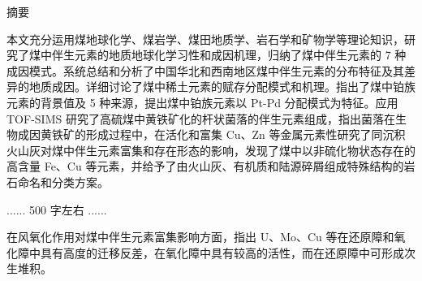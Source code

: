 \clearpage
\pagestyle{fancy}
{}
\setcounter{page}{1}

\begin{center}
    \heiti
    \vspace*{12pt}
    摘\quad\quad 要
    \vspace*{6pt}
\end{center}

\begingroup
    \songti
    \setlength{\parindent}{2em}
    \setlength{\parskip}{0pt}
    
    本文充分运用煤地球化学、煤岩学、煤田地质学、岩石学和矿物学等理论知识，研究了煤中伴生元素的地质地球化学习性和成因机理，归纳了煤中伴生元素的 7 种成因模式。系统总结和分析了中国华北和西南地区煤中伴生元素的分布特征及其差异的地质成因。详细讨论了煤中稀土元素的赋存分配模式和机理。指出了煤中铂族元素的背景值及 5 种来源，提出煤中铂族元素以 Pt-Pd 分配模式为特征。应用 TOF-SIMS 研究了高硫煤中黄铁矿化的杆状菌落的伴生元素组成，指出菌落在生物成因黄铁矿的形成过程中，在活化和富集 Cu、Zn 等金属元素性研究了同沉积火山灰对煤中伴生元素富集和存在形态的影响，发现了煤中以非硫化物状态存在的高含量 Fe、Cu 等元素，并给予了由火山灰、有机质和陆源碎屑组成特殊结构的岩石命名和分类方案。
    \par
    \vspace{\baselineskip}
    \centerline{\color{red}...... 500 字左右 ......}
    \par
    \vspace{\baselineskip}
    在风氧化作用对煤中伴生元素富集影响方面，指出 U、Mo、Cu 等在还原障和氧化障中具有高度的迁移反差，在氧化障中具有较高的活性，而在还原障中可形成次生堆积。
    \par
\endgroup

\par
\vspace{6pt}
\begingroup
    \noindent{}
\endgroup
\clearpage
